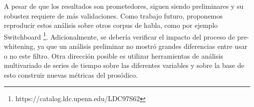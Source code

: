 A pesar de que los resultados son prometedores, siguen siendo preliminares y su robustez requiere de más validaciones. Como trabajo futuro, proponemos reproducir estos análisis sobre otros corpus de habla, como por ejemplo Switchboard \footnote{https://catalog.ldc.upenn.edu/LDC97S62}. Adicionalmente, se debería verificar el impacto del proceso de pre-whitening, ya que un análisis preliminar no mostró grandes diferencias entre usar o no este filtro. Otra dirección posible es utilizar herramientas de análisis multivariado de series de tiempo sobre las diferentes variables \ap y sobre la base de esto construir nuevas métricas del \entrainment prosódico.
